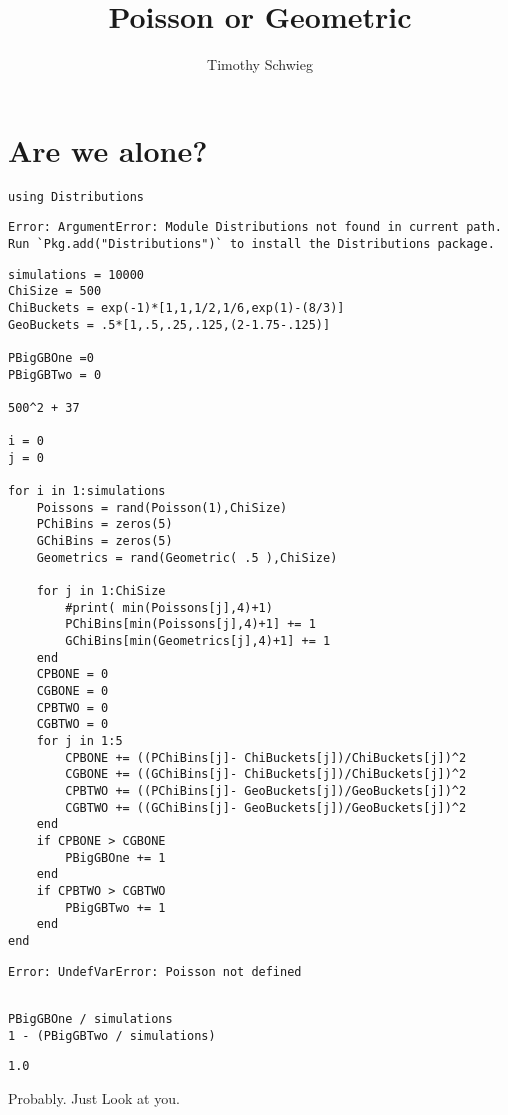 \documentclass[10pt]{paper}
\title{Poisson or Geometric}
\author{Timothy Schwieg}
\begin{document}
\section*{Are we alone?}
\begin{verbatim}
using Distributions
\end{verbatim}
\begin{verbatim}
Error: ArgumentError: Module Distributions not found in current path.
Run `Pkg.add("Distributions")` to install the Distributions package.
\end{verbatim}

\begin{verbatim}
simulations = 10000
ChiSize = 500
ChiBuckets = exp(-1)*[1,1,1/2,1/6,exp(1)-(8/3)]
GeoBuckets = .5*[1,.5,.25,.125,(2-1.75-.125)]

PBigGBOne =0
PBigGBTwo = 0

500^2 + 37

i = 0
j = 0

for i in 1:simulations
    Poissons = rand(Poisson(1),ChiSize)
    PChiBins = zeros(5)
    GChiBins = zeros(5)
    Geometrics = rand(Geometric( .5 ),ChiSize)
    
    for j in 1:ChiSize
        #print( min(Poissons[j],4)+1)
        PChiBins[min(Poissons[j],4)+1] += 1
        GChiBins[min(Geometrics[j],4)+1] += 1
    end
    CPBONE = 0
    CGBONE = 0
    CPBTWO = 0
    CGBTWO = 0
    for j in 1:5
        CPBONE += ((PChiBins[j]- ChiBuckets[j])/ChiBuckets[j])^2
        CGBONE += ((GChiBins[j]- ChiBuckets[j])/ChiBuckets[j])^2
        CPBTWO += ((PChiBins[j]- GeoBuckets[j])/GeoBuckets[j])^2
        CGBTWO += ((GChiBins[j]- GeoBuckets[j])/GeoBuckets[j])^2
    end
    if CPBONE > CGBONE
        PBigGBOne += 1
    end
    if CPBTWO > CGBTWO 
        PBigGBTwo += 1
    end
end
\end{verbatim}
\begin{verbatim}
Error: UndefVarError: Poisson not defined
\end{verbatim}

\begin{verbatim}

PBigGBOne / simulations
1 - (PBigGBTwo / simulations)
\end{verbatim}
\begin{verbatim}
1.0
\end{verbatim}



Probably. Just Look at you.
\end{document}
